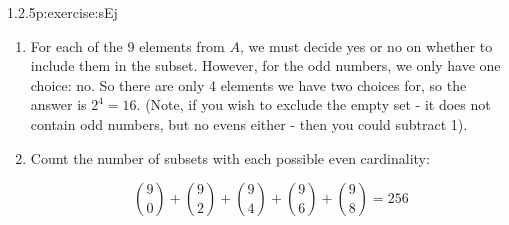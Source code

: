 \documentclass[twoside,11pt,]{book}
\numberwithin{equation}{chapter}
\begin{document}
\begin{divisionsolution}{1.2.5}{}{p:exercise:sEj}
\begin{enumerate}[label=(\alph*)]
\item{}For each of the 9 elements from \(A\text{,}\) we must decide yes or no on whether to include them in the subset. However, for the odd numbers, we only have one choice: no. So there are only 4 elements we have two choices for, so the answer is \(2^4 = 16\text{.}\) (Note, if you wish to exclude the empty set - it does not contain odd numbers, but no evens either - then you could subtract 1).%
\item{}Count the number of subsets with each possible even cardinality:%
\par
%
\begin{equation*}
{9 \choose 0} + {9 \choose 2} + {9\choose 4} + {9 \choose 6} + {9 \choose 8} = 256
\end{equation*}
%
\end{enumerate}
%
\end{divisionsolution}%
\end{document}
